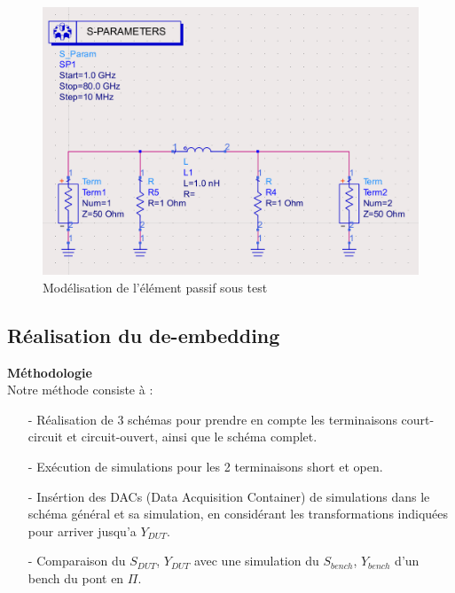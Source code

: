 \documentclass[a4paper]{article}
\begin{document}
\begin{figure}[!htb]
\begin{center}
  \includegraphics[scale=0.23]{de-embedding_bench.png}
  \caption{Mod\'elisation de l'\'el\'ement passif sous test}
  \label{de-embedding-bench}
\end{center}
\end{figure}

\subsection{R\'ealisation du de-embedding}
\textbf{M\'ethodologie}\\
Notre m\'ethode consiste \`a :
\begin{itemize}
  \item [-] R\'ealisation de 3 sch\'emas pour prendre en compte les terminaisons court-circuit et circuit-ouvert, ainsi que le sch\'ema
  complet.
  \item[-] Ex\'ecution de simulations pour les 2 terminaisons short et open.
  \item[-] Ins\'ertion des DACs (Data Acquisition Container) de simulations dans le sch\'ema g\'en\'eral et sa simulation, en consid\'erant les transformations indiqu\'ees
  pour arriver jusqu'a $Y_{DUT}$.
  \item[-] Comparaison du $S_{DUT}$, $Y_{DUT}$ avec une simulation du $S_{bench}$, $Y_{bench}$ d'un bench du pont en $\Pi$.
\end{itemize}
\end{document}
